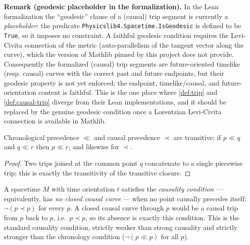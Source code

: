 \medskip
\noindent\textbf{Remark (geodesic placeholder in the formalization).} In the Lean formalization the ``geodesic'' clause of a (causal) trip segment is currently a \emph{placeholder}: the predicate \texttt{Physicslib4.Spacetime.IsGeodesic} is defined to be \texttt{True}, so it imposes no constraint. A faithful geodesic condition requires the Levi-Civita connection of the metric (auto-parallelism of the tangent vector along the curve), which the version of Mathlib pinned by this project does not provide. Consequently the formalized (causal) trip segments are future-oriented timelike (resp. causal) curves with the correct past and future endpoints, but their geodesic property is not yet enforced; the endpoint, timelike/causal, and future-orientation content is faithful. This is the one place where \ref{def:trip} and \ref{def:causal-trip} diverge from their Lean implementations, and it should be replaced by the genuine geodesic condition once a Lorentzian Levi-Civita connection is available in Mathlib.

\begin{theorem}
    \label{thrm:precedence-transitive}
    \leanok
    Chronological precedence $\ll$ and causal precedence $\prec$ are transitive: if $p \ll q$ and $q \ll r$ then $p \ll r$, and likewise for $\prec$.
\end{theorem}
\begin{proof}
    \leanok
    Two trips joined at the common point $q$ concatenate to a single piecewise trip; this is exactly the transitivity of the transitive closure.
\end{proof}

\begin{definition}
    \label{def:no-closed-causal-curve}
    \leanok
    A spacetime $M$ with time orientation $t$ satisfies the \emph{causality condition} --- equivalently, has \emph{no closed causal curve} --- when no point causally precedes itself: $\lnot(p \prec p)$ for every $p$. A closed causal curve through $p$ would be a causal trip from $p$ back to $p$, i.e.\ $p \prec p$, so its absence is exactly this condition. This is the standard causality condition, strictly weaker than strong causality and strictly stronger than the chronology condition ($\lnot(p \ll p)$ for all $p$).
\end{definition}


